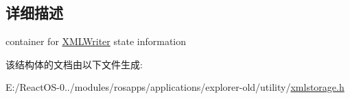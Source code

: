 \subsection{详细描述}
container for \hyperlink{struct_x_m_l_storage_1_1_x_m_l_writer}{X\+M\+L\+Writer} state information 

该结构体的文档由以下文件生成\+:\begin{DoxyCompactItemize}
\item 
E\+:/\+React\+O\+S-\/0../modules/rosapps/applications/explorer-\/old/utility/\hyperlink{xmlstorage_8h}{xmlstorage.\+h}\end{DoxyCompactItemize}
